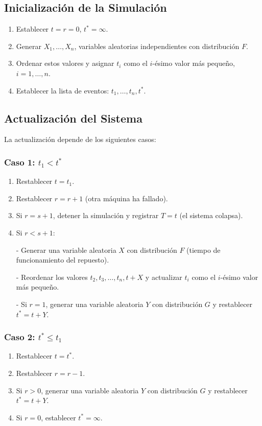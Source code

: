 \documentclass[a4paper, 12pt]{article}
\begin{document}
\subsection*{Inicialización de la Simulación}
\begin{enumerate}
    \item Establecer $ t = r = 0 $, $ t^* = \infty $.
    \item Generar $ X_1, \dots, X_n $, variables aleatorias independientes con distribución $ F $.
    \item Ordenar estos valores y asignar $ t_i $ como el $ i $-ésimo valor más pequeño, $ i = 1, \dots, n $.
    \item Establecer la lista de eventos: $ t_1, \dots, t_n, t^* $.
\end{enumerate}

\subsection*{Actualización del Sistema}
La actualización depende de los siguientes casos:

\subsubsection*{Caso 1: $ t_1 < t^* $}
\begin{enumerate}
    \item Restablecer $ t = t_1 $.
    \item Restablecer $ r = r + 1 $ (otra máquina ha fallado).
    \item Si $ r = s + 1 $, detener la simulación y registrar $ T = t $ (el sistema colapsa).
    \item Si $ r < s + 1 $:
    
        
- Generar una variable aleatoria $ X $ con distribución $ F $ (tiempo de funcionamiento del repuesto).
        
- Reordenar los valores $ t_2, t_3, \dots, t_n, t + X $ y actualizar $ t_i $ como el $ i $-ésimo valor más pequeño.
        
- Si $ r = 1 $, generar una variable aleatoria $ Y $ con distribución $ G $ y restablecer $ t^* = t + Y $.
    
\end{enumerate}

\subsubsection*{Caso 2: $ t^* \leq t_1 $}
\begin{enumerate}
    \item Restablecer $ t = t^* $.
    \item Restablecer $ r = r - 1 $.
    \item Si $ r > 0 $, generar una variable aleatoria $ Y $ con distribución $ G $ y restablecer $ t^* = t + Y $.
    \item Si $ r = 0 $, establecer $ t^* = \infty $.
\end{enumerate}
\end{document}
